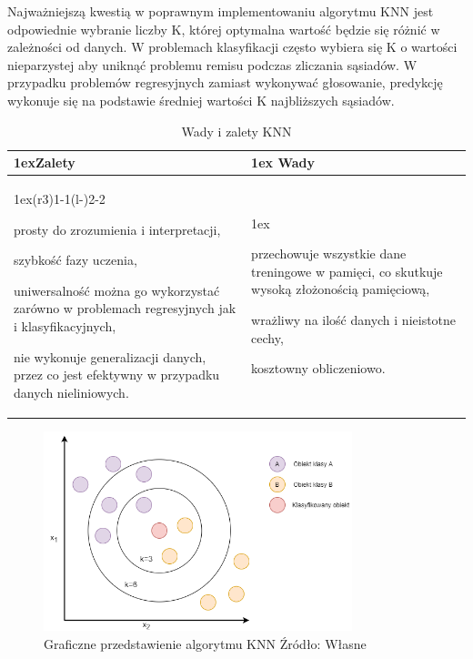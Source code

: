 Najważniejszą kwestią w poprawnym implementowaniu algorytmu KNN jest odpowiednie wybranie liczby
K, której optymalna wartość będzie się różnić w zależności od danych. W problemach 
klasyfikacji często wybiera się K o wartości nieparzystej aby uniknąć problemu remisu
podczas zliczania sąsiadów. W przypadku problemów regresyjnych zamiast wykonywać głosowanie,
predykcję wykonuje się na podstawie średniej wartości K najbliższych sąsiadów.

\begin{table}[h]
    \begin{tabularx}{\linewidth}{>{\parskip1ex}X@{\kern4\tabcolsep}>{\parskip1ex}X}
    \toprule
    \hfil\bfseries Zalety
    &
    \hfil\bfseries Wady
    \\\cmidrule(r{3\tabcolsep}){1-1}\cmidrule(l{-\tabcolsep}){2-2}
    
    prosty do zrozumienia i interpretacji,\par
    szybkość fazy uczenia,\par
    uniwersalność można go wykorzystać zarówno w problemach regresyjnych jak i klasyfikacyjnych,\par
    nie wykonuje generalizacji danych, przez co jest efektywny w przypadku danych nieliniowych.\par
    &
    
    przechowuje wszystkie dane treningowe w pamięci, co skutkuje wysoką złożonością pamięciową,\par
    wrażliwy na ilość danych i nieistotne cechy,\par
    kosztowny obliczeniowo.\par
    \\\bottomrule
    \end{tabularx}
    \caption{Wady i zalety KNN}
\end{table}
    

\begin{figure}[h]
    \centering
    \includegraphics[width=0.8\textwidth]{./Img/KNN.png}
    \caption{Graficzne przedstawienie algorytmu KNN Źródło: Własne}
\end{figure}


